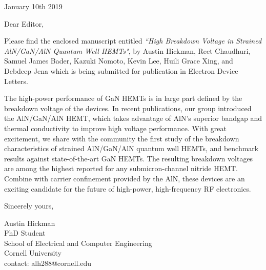 \documentclass{letter}
\begin{document}
\begin{letter}

January 10th 2019
\bigskip



Dear Editor,

\bigskip
Please find the enclosed manuscript entitled \textit{``High Breakdown Voltage in Strained AlN/GaN/AlN Quantum Well HEMTs"}, by Austin Hickman, Reet Chaudhuri, Samuel James Bader, Kazuki Nomoto, Kevin Lee, Huili Grace Xing, and Debdeep Jena which is being submitted for publication in Electron Device Letters.

The high-power performance of GaN HEMTs is in large part defined by the breakdown voltage of the devices. In recent publications, our group introduced the AlN/GaN/AlN HEMT, which takes advantage of AlN's superior bandgap and thermal conductivity to improve high voltage performance. With great excitement, we share with the community the first study of the breakdown characteristics of strained AlN/GaN/AlN quantum well HEMTs, and benchmark results against state-of-the-art GaN HEMTs. The resulting breakdown voltages are among the highest reported for any submicron-channel nitride HEMT. Combine with carrier confinement provided by the AlN, these devices are an exciting candidate for the future of high-power, high-frequency RF electronics.




\bigskip

Sincerely yours,
\bigskip


Austin Hickman
\\PhD Student
\\School of Electrical and Computer Engineering
\\Cornell University
\\contact: alh288@cornell.edu
\end{letter}
\end{document}
